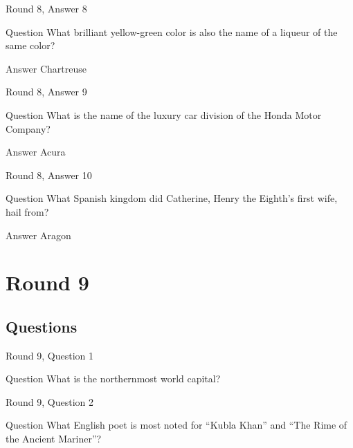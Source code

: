 \documentclass[11pt]{beamer}
\begin{document}
\begin{frame}{Round 8, Answer 8}
\begin{block}{Question}
What brilliant yellow-green color is also the name of a liqueur of the same color\@?
\end{block}
\pause{}
\begin{block}{Answer}
Chartreuse
\end{block}
\end{frame}
    

\begin{frame}{Round 8, Answer 9}
\begin{block}{Question}
What is the name of the luxury car division of the Honda Motor Company\@?
\end{block}
\pause{}
\begin{block}{Answer}
Acura
\end{block}
\end{frame}
    

\begin{frame}{Round 8, Answer 10}
\begin{block}{Question}
What Spanish kingdom did Catherine, Henry the Eighth's first wife, hail from\@?
\end{block}
\pause{}
\begin{block}{Answer}
Aragon
\end{block}
\end{frame}
    

\section{Round 9}
    
\subsection{Questions}

\begin{frame}{Round 9, Question 1}
\begin{block}{Question}
What is the northernmost world capital\@?
\end{block}
\end{frame}
    

\begin{frame}{Round 9, Question 2}
\begin{block}{Question}
What English poet is most noted for ``Kubla Khan'' and ``The Rime of the Ancient Mariner''\@?
\end{block}
\end{frame}
    
\end{document}
